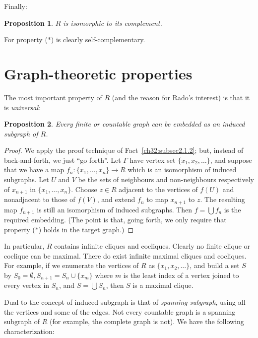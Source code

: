 \documentclass{book}
\newtheorem{proposition}{Proposition}
\begin{document}
Finally:
\begin{proposition}\label{ch32:prop3.5} 
$R$ is isomorphic to its complement.
\end{proposition}

For property ($\ast$) is clearly self-complementary.

\section{Graph-theoretic properties}%
\label{ch32:sec2.4}

The most important property of $R$ (and the reason for Rado's
interest) is that it is \emph{universal}: 

\begin{proposition}\label{ch32:prop4.1} 
Every finite or countable graph can be embedded
as an induced subgraph of $R$.
\end{proposition}
\begin{proof}
We apply the proof technique of Fact~\ref{ch32:subsec2.1.2}; 
but, instead of back-and-forth, we
just ``go forth''. Let $\Gamma$ have vertex set $\{x_1,
x_2,\ldots\}$, and suppose that we have a map $f_n : \{x_1,
\ldots,x_n\} \rightarrow R$ which is an isomorphism of induced
subgraphs. Let $U$ and $V$ be the sets of neighbours and
non-neighbours respectively of $x_{n+1}$ in $\{x_1, \ldots,x_n\}$.
Choose $z \in R$ adjacent to the vertices of $f(U)$ and nonadjacent
to those of $f(V)$, and extend $f_n$ to map $x_{n+1}$ to $z$. The
resulting map $f_{n+1}$ is still an isomorphism of induced
subgraphs. Then $f = \bigcup f_n$ is the required embedding. (The
point is that, going forth, we only require that property ($\ast$)
holds in the target graph.)
\end{proof}

In particular, $R$ contains infinite cliques and cocliques. Clearly
no finite clique or coclique can be maximal. There do exist infinite
maximal cliques and cocliques. For example, if we enumerate the
vertices of $R$ as $\{x_1, x_2, \ldots\}$, and build a set $S$ by
$S_0 = \emptyset, S_{n +1} = S_n \cup \{x_m\}$ where $m$ is the
least index of a vertex joined to every vertex in $S_n$, and $S =
\bigcup S_n$, then $S$ is a maximal clique.

Dual to the concept of induced subgraph is that of \emph{spanning
subgraph}, using all the vertices and some of the edges. Not every
countable graph is a spanning subgraph of $R$ (for example, the
complete graph is not). We have the following characterization:
\end{document}
